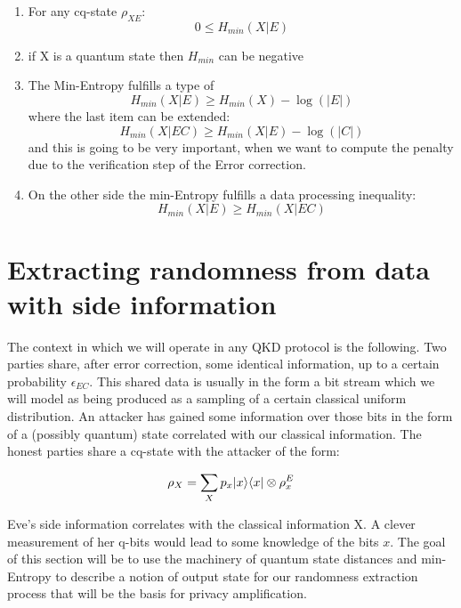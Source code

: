 \begin{enumerate}
	\item For any cq-state $\rho_{XE}$:
	      \begin{equation}
		      0 \le H_{min}(X|E)
	      \end{equation}
	\item if X is a quantum state then $H_{min}$ can be negative
	\item The Min-Entropy fulfills a type of
	      \begin{equation}
		      H_{min}(X|E) \ge H_{min}(X) - \log(|E|)
	      \end{equation}
	      where the last item can be extended:
	      \begin{equation}
		      H_{min}(X|EC) \ge H_{min}(X|E) - \log(|C|)
	      \end{equation}
	      and this is going to be very important, when we want to compute the penalty due to the verification step of the Error correction.
	\item  On the other side the min-Entropy fulfills a data processing inequality:
	      \begin{equation}
		      H_{min}(X|E) \ge H_{min}(X|EC)
	      \end{equation}
\end{enumerate}
%
\section{Extracting randomness from data with side information}

The context in which we will operate in any QKD protocol is the following. Two parties share, after error correction, some identical information, up to a certain probability $\epsilon_{EC}$. This shared data is usually in the form a bit stream which we will model as being produced as a sampling of a certain classical uniform distribution. An attacker has gained some information over those bits in the form of a (possibly quantum) state correlated with our classical information. The honest parties share a cq-state with the attacker of the form:

\begin{equation} \label{eq:cq_state}
	\rho_X = \sum_X p_x\lvert x\rangle \langle x\rvert \otimes \rho^E_x
\end{equation}

Eve's side information correlates with the classical information X. A clever measurement of her q-bits would lead to some knowledge of the bits $x$.
The goal of this section will be to use the machinery of quantum state distances and min-Entropy to describe a notion of output state for our randomness extraction process that will be the basis for privacy amplification.

